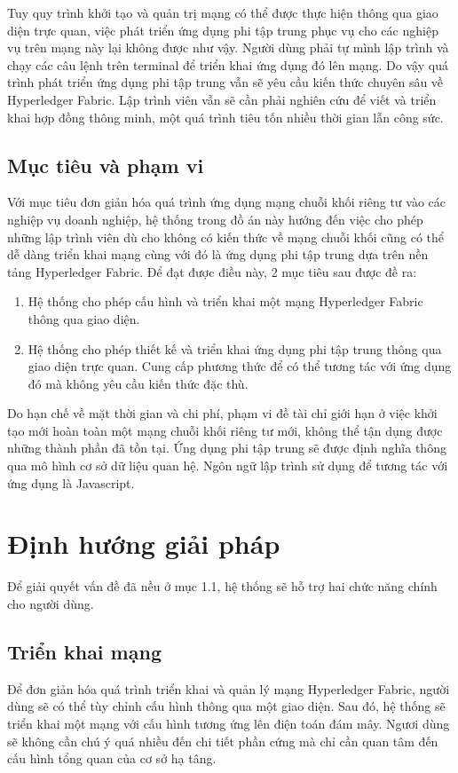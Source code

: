 \documentclass[../DoAn.tex]{subfiles}
\begin{document}
Tuy quy trình khởi tạo và quản trị mạng có thể được thực hiện thông qua giao diện trực quan, việc phát triển ứng dụng phi tập trung phục vụ cho các nghiệp vụ trên mạng này lại không được như vậy. Người dùng phải tự mình lập trình và chạy các câu lệnh trên terminal để triển khai ứng dụng đó lên mạng. Do vậy quá trình phát triển ứng dụng phi tập trung vẫn sẽ yêu cầu kiến thức chuyên sâu về Hyperledger Fabric. Lập trình viên vẫn sẽ cần phải nghiên cứu để viết và triển khai hợp đồng thông minh, một quá trình tiêu tốn nhiều thời gian lẫn công sức.

\subsection{Mục tiêu và phạm vi}

Với mục tiêu đơn giản hóa quá trình ứng dụng mạng chuỗi khối riêng tư vào các nghiệp vụ doanh nghiệp, hệ thống trong đồ án này hướng đến việc cho phép những lập trình viên dù cho không có kiến thức về mạng chuỗi khối cũng có thể dễ dàng triển khai mạng cùng với đó là ứng dụng phi tập trung dựa trên nền tảng Hyperledger Fabric. Để đạt được điều này, 2 mục tiêu sau được đề ra:
\begin{enumerate}
	\item Hệ thống cho phép cấu hình và triển khai một mạng Hyperledger Fabric thông qua giao diện.
	\item Hệ thống cho phép thiết kế và triển khai ứng dụng phi tập trung thông qua giao diện trực quan. Cung cấp phương thức để có thể tương tác với ứng dụng đó mà không yêu cầu kiến thức đặc thù.
\end{enumerate}

Do hạn chế về mặt thời gian và chi phí, phạm vi đề tài chỉ giới hạn ở việc khởi tạo mới hoàn toàn một mạng chuỗi khối riêng tư mới, không thể tận dụng được những thành phần đã tồn tại. Ứng dụng phi tập trung sẽ được định nghĩa thông qua mô hình cơ sở dữ liệu quan hệ. Ngôn ngữ lập trình sử dụng để tương tác với ứng dụng là Javascript.

\section{Định hướng giải pháp}
\label{section:1.3}

Để giải quyết vấn đề đã nều ở mục 1.1, hệ thống sẽ hỗ trợ hai chức năng chính cho người dùng.

\subsection{Triển khai mạng}
Để đơn giản hóa quá trình triển khai và quản lý mạng Hyperledger Fabric, người dùng sẽ có thể tùy chỉnh cấu hình thông qua một giao diện. Sau đó, hệ thống sẽ triển khai một mạng với cấu hình tương ứng lên điện toán đám mây. Ngươi dùng sẽ không cần chú ý quá nhiều đến chi tiết phần cứng mà chỉ cần quan tâm đến cấu hình tổng quan của cơ sở hạ tâng. 
\end{document}
